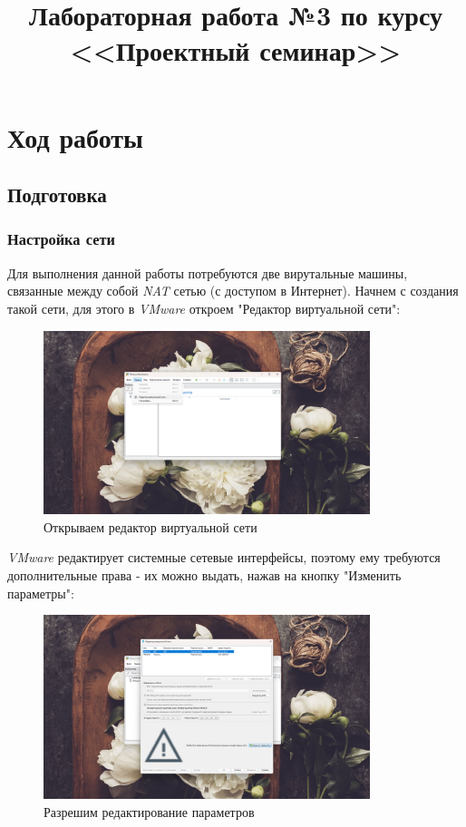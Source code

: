 \documentclass[a4paper]{article}
\title{
  Лабораторная работа №3 по курсу \\
  <<Проектный семинар>>  
}
\begin{document}
  \templatedtitlepage
  
  \toc

  \section{Ход работы}

  \subsection{Подготовка}

  \subsubsection{Настройка сети}

  Для выполнения данной работы потребуются две вирутальные машины, связанные между
  собой \textit{NAT} сетью (с доступом в Интернет). Начнем с создания такой сети,
  для этого в \textit{VMware} откроем "Редактор виртуальной сети":

  \begin{figure}[H]
    \centering
    \includegraphics[width=0.85\textwidth]{03_00 (2)}
    \caption{Открываем редактор виртуальной сети}
    \label{img:2}
  \end{figure}

  \textit{VMware} редактирует системные сетевые интерфейсы, поэтому ему требуются
  дополнительные права - их можно выдать, нажав на кнопку "Изменить параметры":

  \begin{figure}[H]
    \centering
    \includegraphics[width=0.85\textwidth]{03_00 (3)}
    \caption{Разрешим редактирование параметров}
    \label{img:3}
  \end{figure}
\end{document}
